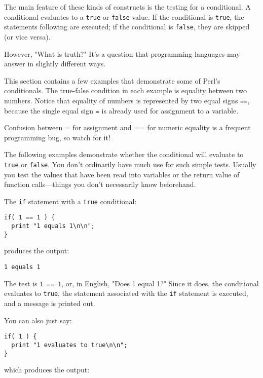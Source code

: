 The main feature of these kinds of constructs is the testing for a conditional. A conditional evaluates to a \verb|true| or \verb|false| value. If the conditional is \verb|true|, the statements following are executed; if the conditional is \verb|false|, they are skipped (or vice versa).

However, "What is truth?" It's a question that programming languages may answer in slightly different ways.

This section contains a few examples that demonstrate some of Perl's conditionals. The true-false condition in each example is equality between two numbers. Notice that equality of numbers is represented by two equal signs \verb|==|, because the single equal sign \verb|=| is already used for assignment to a variable. 

\begin{adjustwidth}{2cm}{2cm}
  Confusion between = for assignment and == for numeric equality is a frequent programming bug, so watch for it! 
\end{adjustwidth}

The following examples demonstrate whether the conditional will evaluate to \verb|true| or \verb|false|. You don't ordinarily have much use for such simple tests. Usually you test the values that have been read into variables or the return value of function calls—things you don't necessarily know beforehand.

The \verb|if| statement with a \verb|true| conditional: 

\begin{lstlisting}
if( 1 == 1 ) {
  print "1 equals 1\n\n";
}
\end{lstlisting}

produces the output:

\begin{lstlisting}
1 equals 1
\end{lstlisting}

The test is \verb|1 == 1|, or, in English, "Does 1 equal 1?" Since it does, the conditional evaluates to \verb|true|, the statement associated with the \verb|if| statement is executed, and a message is printed out.

You can also just say:

\begin{lstlisting}
if( 1 ) {
  print "1 evaluates to true\n\n";
}
\end{lstlisting}

which produces the output:

